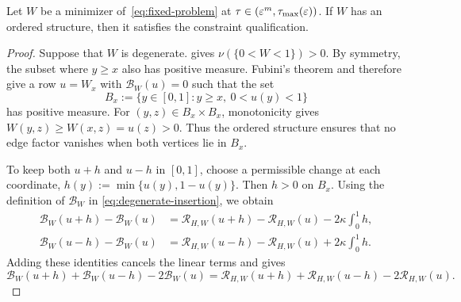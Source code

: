 \begin{lemma}\label{lem:ordered-nondegenerate}
Let $W$ be a minimizer of~\eqref{eq:fixed-problem} at
$\tau\in(\varepsilon^m,\tau_{\max}(\varepsilon))$. If $W$ has an ordered structure,
then it satisfies the constraint qualification.
\end{lemma}

\begin{proof}
Suppose that $W$ is degenerate.  gives
$\nu(\{0<W<1\})>0$. By symmetry, the subset where $y\ge x$ also has positive
measure.  Fubini's theorem and  therefore
give a row $u=W_x$ with $\mathcal B_W(u)=0$ such that the set
\[
  B_x:=\{y \in [0,1]:y\ge x,\ 0<u(y)<1\}
\]
has positive measure.  For $(y,z)\in B_x\times B_x$, monotonicity gives
$W(y,z)\ge W(x,z)=u(z)>0$.
Thus the ordered structure ensures that no edge factor vanishes when
both vertices lie in $B_x$.

To keep both $u+h$ and $u-h$ in $[0,1]$, choose a permissible
change at each coordinate, $h(y):=\min\{u(y),1-u(y)\}$.
Then $h>0$ on $B_x$. Using the definition of $\mathcal B_W$ in
\eqref{eq:degenerate-insertion}, we obtain
\begin{align*}
  \mathcal B_W(u+h)-\mathcal B_W(u)
    &=\mathcal R_{H,W}(u+h)-\mathcal R_{H,W}(u)-2\kappa\int_0^1h,\\
  \mathcal B_W(u-h)-\mathcal B_W(u)
    &=\mathcal R_{H,W}(u-h)-\mathcal R_{H,W}(u)+2\kappa\int_0^1h.
\end{align*}
Adding these identities cancels the linear terms and gives
\begin{equation}\label{eq:rooted-density-difference}
  \mathcal B_W(u+h)+\mathcal B_W(u-h)-2\mathcal B_W(u)
  =\mathcal R_{H,W}(u+h)+\mathcal R_{H,W}(u-h)-2\mathcal R_{H,W}(u).
\end{equation}


\end{proof}
